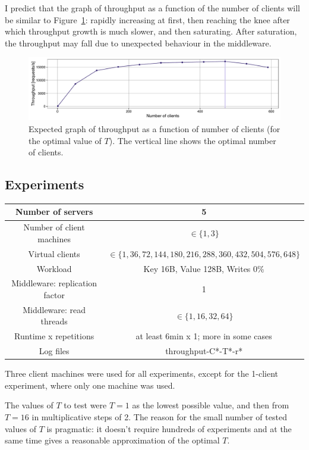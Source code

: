 \documentclass[11pt]{article}
\begin{document}
I predict that the graph of throughput as a function of the number of clients will be similar to Figure~\ref{fig:exp1:hyp:throughput}: rapidly increasing at first, then reaching the knee after which throughput growth is much slower, and then saturating. After saturation, the throughput may fall due to unexpected behaviour in the middleware.

\begin{figure}[h]
\centering
\includegraphics[width=\textwidth]{figures/hypothesis_throughput.pdf}
\caption{Expected graph of throughput as a function of number of clients (for the optimal value of $T$). The vertical line shows the optimal number of clients.}
\label{fig:exp1:hyp:throughput}
\end{figure}

\subsection{Experiments}
\begin{center}
\small{
\smallskip
\begin{tabular}{|c|c|}
\hline Number of servers & 5 \\ 
\hline Number of client machines & $\in \{1, 3\}$ \\ 
\hline Virtual clients & $\in \{1, 36, 72, 144, 180, 216, 288, 360, 432, 504, 576, 648\}$ \\ 
\hline Workload & Key 16B, Value 128B, Writes 0\% \\
\hline Middleware: replication factor & 1 \\ 
\hline Middleware: read threads & $\in\{1, 16, 32, 64\}$ \\ 
\hline Runtime x repetitions & at least 6min x 1; more in some cases \\ 
\hline Log files & throughput-C*-T*-r* \\
\hline 
\end{tabular} }
\end{center}

Three client machines were used for all experiments, except for the 1-client experiment, where only one machine was used.

The values of $T$ to test were $T=1$ as the lowest possible value, and then from $T=16$ in multiplicative steps of 2. The reason for the small number of tested values of $T$ is pragmatic: it doesn't require hundreds of experiments and at the same time gives a reasonable approximation of the optimal $T$.
\end{document}
